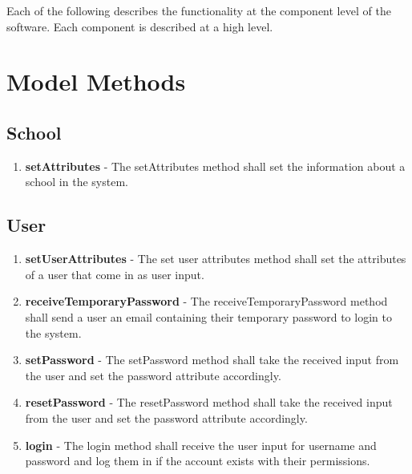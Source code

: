 \documentclass[letterpaper,12pt,oneside,listof=totoc]{scrreprt}
\begin{document}
Each of the following describes the functionality at the component level of the software. Each component is described at a high level.

\section{Model Methods}

\subsection{School}
\begin{enumerate}
    \item \textbf{setAttributes} - The setAttributes method shall set the information about a school in the system.
\end{enumerate}

\subsection{User}
\begin{enumerate}
    \item \textbf{setUserAttributes} - The set user attributes method shall set the attributes of a user that come in as user input.
    \item \textbf{receiveTemporaryPassword} - The receiveTemporaryPassword method shall send a user an email containing their temporary password to login to the system.
    \item \textbf{setPassword} - The setPassword method shall take the received input from the user and set the password attribute accordingly.
    \item \textbf{resetPassword} - The resetPassword method shall take the received input from the user and set the password attribute accordingly.
    \item \textbf{login} - The login method shall receive the user input for username and password and log them in if the account exists with their permissions.
\end{enumerate}
\end{document}
